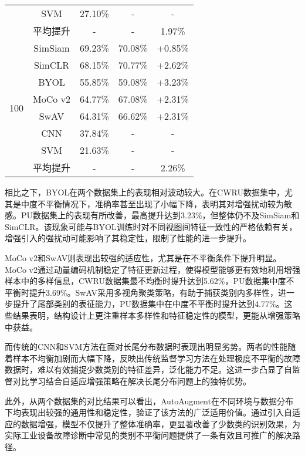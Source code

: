 \documentclass[master]{thesis-uestc}
\begin{document}
\begin{table}[htbp!]
\begin{tabular}{ccccc}
            & SVM     & 27.10\% & -       & -       \\
            & 平均提升 & - & - & 1.97\% \\
        \midrule
        \multirow{8}{*}{100} 
            & SimSiam & 69.23\% & 70.08\% & +0.85\% \\
            & SimCLR  & 68.15\% & 70.77\% & +2.62\% \\
            & BYOL    & 55.85\% & 59.08\% & +3.23\% \\
            & MoCo v2 & 64.77\% & 67.08\% & +2.31\% \\
            & SwAV    & 64.31\% & 66.62\% & +2.31\% \\
            & CNN     & 37.84\% & -       & -       \\
            & SVM     & 21.63\% & -       & -       \\
            & 平均提升 & - & - & 2.26\% \\
        \bottomrule
    \end{tabular}
    \label{tab:longtail_autoaugment_comparison_pu}
\end{table}

相比之下，BYOL在两个数据集上的表现相对波动较大。在CWRU数据集中，尤其是中度不平衡情况下，准确率甚至出现了小幅下降，表明其对增强扰动较为敏感。PU数据集上的表现有所改善，最高提升达到3.23\%，但整体仍不及SimSiam和SimCLR。该现象可能与BYOL训练时对不同视图间特征一致性的严格依赖有关，增强引入的强扰动可能影响了其稳定性，限制了性能的进一步提升。

MoCo v2和SwAV则表现出较强的适应性，尤其是在不平衡条件下提升明显。MoCo v2通过动量编码机制稳定了特征更新过程，使得模型能够更有效地利用增强样本中的多样信息，CWRU数据集最不均衡时提升达到5.62\%，PU数据集中度不平衡时提升3.69\%。SwAV采用多视角聚类策略，有助于捕获类别内多样性，进一步提升了尾部类别的表征能力，PU数据集中在中度不平衡时提升达到4.77\%。这些结果表明，结构设计上更注重样本多样性和特征稳定性的模型，更能从增强策略中获益。

而传统的CNN和SVM方法在面对长尾分布数据时表现出明显劣势。两者的性能随着样本不均衡加剧而大幅下降，反映出传统监督学习方法在处理极度不平衡的故障数据时，难以有效捕捉少数类别的特征差异，泛化能力不足。这进一步凸显了自监督对比学习结合自适应增强策略在解决长尾分布问题上的独特优势。

此外，从两个数据集的对比结果可以看出，AutoAugment在不同环境与数据分布下均表现出较强的通用性和稳定性，验证了该方法的广泛适用价值。通过引入自适应的数据增强，模型不仅提升了整体准确率，更显著改善了少数类的识别效果，为实际工业设备故障诊断中常见的类别不平衡问题提供了一条有效且可推广的解决路径。
\end{document}
